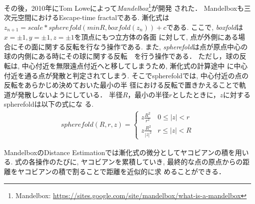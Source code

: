 その後，2010年にTom Loweによって{\it Mandelbox}\footnote{Mandelbox:
\url{https://sites.google.com/site/mandelbox/what-is-a-mandelbox}}が開発
された．
Mandelboxも三次元空間におけるEscape-time fractalである.
漸化式は$z_{n+1} = scale * spherefold(minR, boxfold(z_n)) + c$である.
ここで, {\it boxfold}は$x=\pm1, y=\pm1, z=\pm1$を頂点にもつ立方体の各面
に対して, 点が外側にある場合にその面に関する反転を行なう操作である.
また, {\it spherefold}は点が原点中心の球の内側にある時にその球に関する反転　を行う操作である．
ただし，球の反転は, 中心付近を無限遠点付近へと移してしまうため, 漸化式の計算途中
に中心付近を通る点が発散と判定されてしまう.
そこでspherefoldでは, 中心付近の点の反転をあらかじめ決めておいた最小の半
径における反転で置きかえることで軌道が発散しないようにしている．
半径$R$，最小の半径$r$としたときに，$z$に対するspherefoldは以下の式にな
る.
\begin{align*}
 spherefold(R, r, z) = \begin{cases}
                  z \frac{R^2}{r^2} & 0 \le |z| < r \\
                  z \frac{R^2}{|z|^2} & r \le |z| < R
                 \end{cases}
\end{align*}

MandelboxのDistance Estimationでは漸化式の微分としてヤコビアンの積を用いる.
式の各操作のたびに, ヤコビアンを累積していき,
最終的な点の原点からの距離をヤコビアンの積で割ることで距離を近似的に求
めることができる．

